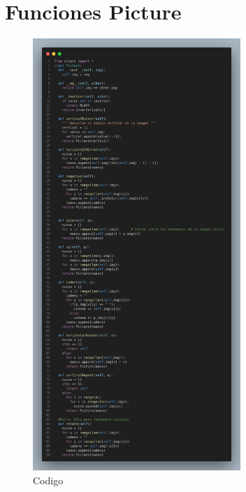 \documentclass[10pt, a4paper]{article}
\begin{document}
\section{Funciones Picture}  
\begin{figure}[H]
  \centering
  \includegraphics[width=0.7\textwidth]{img/Picture.png}
  \caption{Codigo}
\end{figure}
\end{document}
